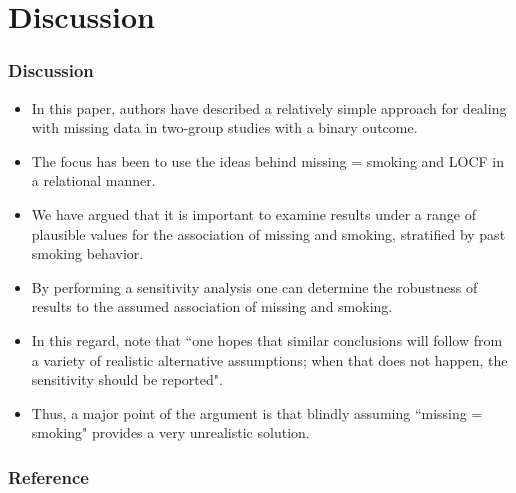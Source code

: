 \documentclass{beamer}
\begin{document}
\section{Discussion}
\begin{frame}
\frametitle{Discussion}
\begin{itemize}
\item In this paper, authors have described a relatively simple approach for dealing with missing data in two-group
studies with a binary outcome. 
\vspace{10pt}
\item The focus has been to use the ideas behind missing = smoking and LOCF in a relational manner.
\vspace{10pt}
\item We have argued that it is important to examine results under a range of plausible values for the association of missing and smoking, stratified by past smoking behavior. 
\vspace{10pt}
\item By performing a sensitivity analysis one can determine the robustness of results to the assumed association of missing and smoking.
\vspace{10pt}
\item In this regard, \citet{schafer2002missing} note that ``one hopes that similar conclusions will follow from a variety of realistic alternative assumptions; when that does not happen, the sensitivity should be reported". 
\vspace{10pt}
\item Thus, a major point of the argument is that blindly assuming ``missing = smoking" provides a very unrealistic solution.
\end{itemize}
\end{frame}
\begin{frame}
\frametitle{Reference}


\end{frame}
\end{document}
